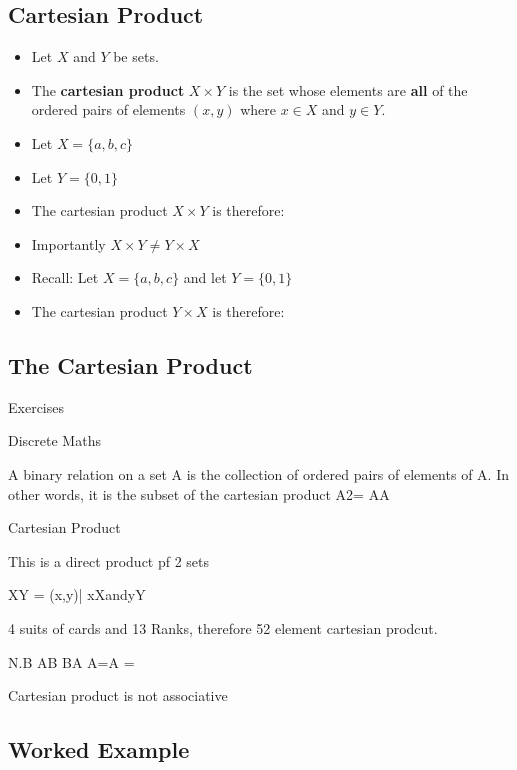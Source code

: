 \documentclass[]{report}
\begin{document}
\subsection{Cartesian Product}
{
\begin{itemize}
\item Let $X$ and $Y$ be sets.
\item The \textbf{cartesian product} $X \times Y$ is the set whose elements are \textbf{all} of 
the ordered pairs of elements $(x,y)$ where $x \in X$ and $y \in Y$.
\end{itemize}

\begin{itemize}
\item Let $X = \{a,b,c\}$
\item Let $Y = \{0,1\}$ 
\item The cartesian product $X \times Y$ is therefore:
\end{itemize}

\begin{itemize}
\item Importantly $X \times Y \neq Y \times X$
\item Recall: Let $X = \{a,b,c\}$ and let $Y = \{0,1\}$ 
\item The cartesian product $Y \times X$ is therefore:
\end{itemize}
}





\subsection{The Cartesian Product}
Exercises


 Discrete Maths
 
A binary relation on a set A is the collection of ordered pairs of elements of A. In other words, it is the subset of the cartesian product A2= AA

Cartesian Product
 
This is a direct product pf 2 sets
 
XY = {(x,y)| xXandyY }
 
4 suits of cards and 13 Ranks, therefore 52 element cartesian prodcut.
 
N.B         AB BA
              A=A =
 
Cartesian product is not associative
\subsection*{Worked Example}
\end{document}
